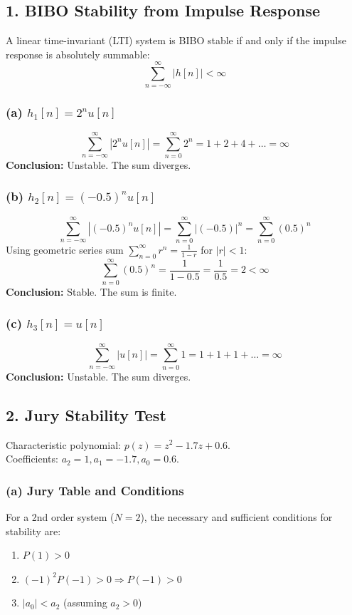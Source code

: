 \documentclass[11pt, a4paper]{article}
\begin{document}
\subsection{1. BIBO Stability from Impulse Response}
A linear time-invariant (LTI) system is BIBO stable if and only if the impulse response is absolutely summable:
$$ \sum_{n=-\infty}^{\infty} |h[n]| < \infty $$

\subsubsection{(a) $h_1[n] = 2^n u[n]$}
$$ \sum_{n=-\infty}^{\infty} |2^n u[n]| = \sum_{n=0}^{\infty} 2^n = 1 + 2 + 4 + \dots = \infty $$
\textbf{Conclusion:} Unstable. The sum diverges.

\subsubsection{(b) $h_2[n] = (-0.5)^n u[n]$}
$$ \sum_{n=-\infty}^{\infty} |(-0.5)^n u[n]| = \sum_{n=0}^{\infty} |(-0.5)|^n = \sum_{n=0}^{\infty} (0.5)^n $$
Using geometric series sum $\sum_{n=0}^{\infty} r^n = \frac{1}{1-r}$ for $|r| < 1$:
$$ \sum_{n=0}^{\infty} (0.5)^n = \frac{1}{1-0.5} = \frac{1}{0.5} = 2 < \infty $$
\textbf{Conclusion:} Stable. The sum is finite.

\subsubsection{(c) $h_3[n] = u[n]$}
$$ \sum_{n=-\infty}^{\infty} |u[n]| = \sum_{n=0}^{\infty} 1 = 1 + 1 + 1 + \dots = \infty $$
\textbf{Conclusion:} Unstable. The sum diverges.

\subsection{2. Jury Stability Test}

Characteristic polynomial: $p(z) = z^2 - 1.7z + 0.6$. \\
Coefficients: $a_2 = 1, a_1 = -1.7, a_0 = 0.6$.

\subsubsection{(a) Jury Table and Conditions}
For a 2nd order system ($N=2$), the necessary and sufficient conditions for stability are:
\begin{enumerate}
    \item $P(1) > 0$
    \item $(-1)^2 P(-1) > 0 \Rightarrow P(-1) > 0$
    \item $|a_0| < a_2$ (assuming $a_2 > 0$)
\end{enumerate}
\end{document}
